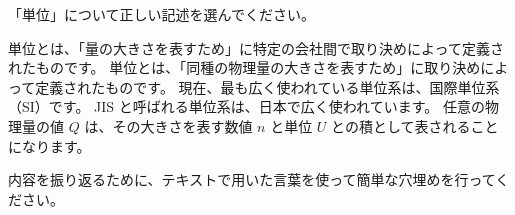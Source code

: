\documentclass[uplatex,dvipdfmx,a4paper,11pt]{jsarticle}
\begin{document}
\begin{qlist}
\begin{qlist2}
		\end{qlist2}
    \vspace{3mm}
	\qitem 「単位」について正しい記述を選んでください。
		\begin{qlist2}
			\qitem 単位とは、「量の大きさを表すため」に特定の会社間で取り決めによって定義されたものです。
			\qitem 単位とは、「同種の物理量の大きさを表すため」に取り決めによって定義されたものです。
			\qitem 現在、最も広く使われている単位系は、国際単位系（SI）です。
			\qitem JIS と呼ばれる単位系は、日本で広く使われています。
			\qitem 任意の物理量の値 $Q$ は、その大きさを表す数値 $n$ と単位 $U$ との積として表されることになります。
		\end{qlist2}
\end{qlist}

内容を振り返るために、テキストで用いた言葉を使って簡単な穴埋めを行ってください。
\end{document}
